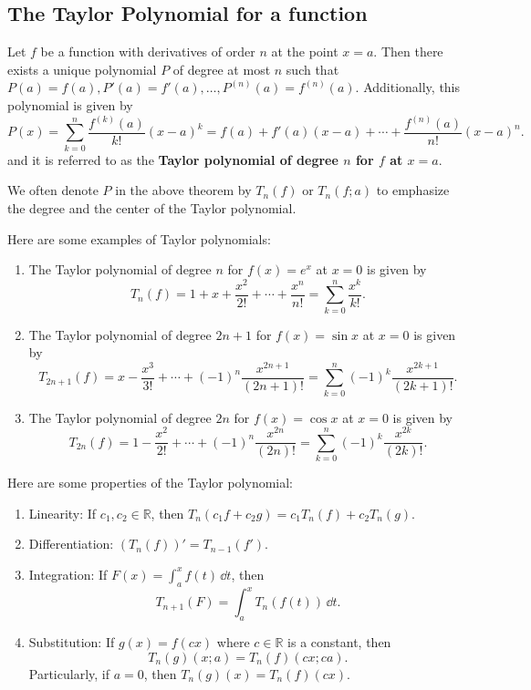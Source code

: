 \documentclass[a4paper]{ctexart}
\begin{document}
    \subsection{The Taylor Polynomial for a function}
    \begin{mythm}
        Let $f$ be a function with derivatives of order $n$ at the point $x=a$. Then there exists a unique polynomial $P$ of degree at most $n$ such that $P(a)=f(a), P'(a)=f'(a), \ldots, P^{(n)}(a) = f^{(n)}(a)$. Additionally, this polynomial is given by
        \[
        P(x) = \sum_{k=0}^n \frac{f^{(k)}(a)}{k!} (x-a)^k = f(a) + f'(a)(x-a) + \cdots + \frac{f^{(n)}(a)}{n!} (x-a)^n.
        \]
        and it is referred to as the \textbf{Taylor polynomial of degree $n$ for $f$ at $x=a$}.
    \end{mythm}
    \begin{mynot}
        We often denote $P$ in the above theorem by $T_n(f)$ or $T_n(f;a)$ to emphasize the degree and the center of the Taylor polynomial.
    \end{mynot}
    \begin{myex}
        Here are some examples of Taylor polynomials:
        \begin{enumerate}[label=(\arabic*)]
            \item The Taylor polynomial of degree $n$ for $f(x)=e^x$ at $x=0$ is given by
            \[
            T_n(f) = 1 + x + \frac{x^2}{2!} + \cdots + \frac{x^n}{n!} = \sum_{k=0}^n \frac{x^k}{k!}.
            \]
            \item The Taylor polynomial of degree $2n+1$ for $f(x)=\sin x$ at $x=0$ is given by
            \[
            T_{2n+1}(f) = x - \frac{x^3}{3!} + \cdots + (-1)^n \frac{x^{2n+1}}{(2n+1)!} = \sum_{k=0}^n (-1)^k \frac{x^{2k+1}}{(2k+1)!}.
            \]
            \item The Taylor polynomial of degree $2n$ for $f(x)=\cos x$ at $x=0$ is given by
            \[
            T_{2n}(f) = 1 - \frac{x^2}{2!} + \cdots + (-1)^n \frac{x^{2n}}{(2n)!} = \sum_{k=0}^n (-1)^k \frac{x^{2k}}{(2k)!}.
            \]
        \end{enumerate}
    \end{myex}
    \begin{mythm}
        Here are some properties of the Taylor polynomial:
        \begin{enumerate}[label=(\arabic*)]
            \item Linearity: If $c_1,c_2 \in \mathbb R$, then $T_n(c_1 f + c_2 g) = c_1 T_n(f) + c_2 T_n(g)$.
            \item Differentiation: $(T_n(f))' = T_{n-1}(f')$.
            \item Integration: If $\displaystyle F(x)=\int_a^x f(t)\, \dd t$, then \[T_{n+1}(F) = \int_a^x T_n(f(t))\, \dd t.\]
            \item Substitution: If $g(x)=f(cx)$ where $c\in \mathbb R$ is a constant, then \[T_n(g)(x;a) = T_n(f)(cx; ca).\]
            Particularly, if $a=0$, then $T_n(g)(x) = T_n(f)(cx)$.
        \end{enumerate}
    \end{mythm}
\end{document}
